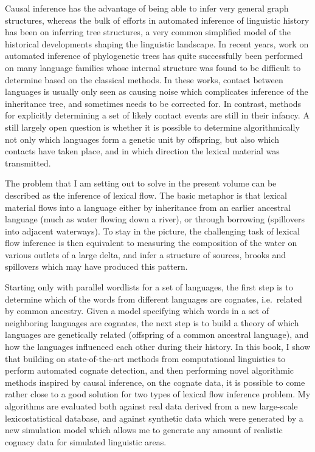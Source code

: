 Causal inference has the advantage of being able to infer very general graph structures, whereas the bulk of efforts in automated inference of linguistic history has been on inferring tree structures, a very common simplified model of the historical developments shaping the linguistic landscape. In recent years, work on automated inference of phylogenetic trees has quite successfully been performed on many language families whose internal structure was found to be difficult to determine based on the classical methods. In these works, contact between languages is usually only seen as causing noise which complicates inference of the inheritance tree, and sometimes needs to be corrected for. In contrast, methods for explicitly determining a set of likely contact events are still in their infancy. A still largely open question is whether it is possible to determine algorithmically not only which languages form a genetic unit by offspring, but also which contacts have taken place, and in which direction the lexical material was transmitted.

The problem that I am setting out to solve in the present volume can be described as the inference of lexical flow. The basic metaphor is that lexical material flows into a language either by inheritance from an earlier ancestral language (much as water flowing down a river), or through borrowing (spillovers into adjacent waterways). To stay in the picture, the challenging task of lexical flow inference is then equivalent to measuring the composition of the water on various outlets of a large delta, and infer a structure of sources, brooks and spillovers which may have produced this pattern.

Starting only with parallel wordlists for a set of languages, the first step is to determine which of the words from different languages are cognates, i.e.\ related by common ancestry. Given a model specifying which words in a set of neighboring languages are cognates, the next step is to build a theory of which languages are genetically related (offspring of a common ancestral language), and how the languages influenced each other during their history. In this book, I show that building on state-of-the-art methods from computational linguistics to perform automated cognate detection, and then performing novel algorithmic methods inspired by causal inference, on the cognate data, it is possible to come rather close to a good solution for two types of lexical flow inference problem. My algorithms are evaluated both against real data derived from a new large-scale lexicostatistical database, and against synthetic data which were generated by a new simulation model which allows me to generate any amount of realistic cognacy data for simulated linguistic areas.

